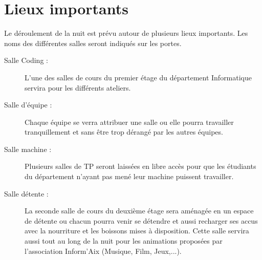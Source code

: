 \documentclass[a4paper,11pt]{article}
\begin{document}
\section{Lieux importants}
Le déroulement de la nuit est prévu autour de plusieurs lieux importants. Les noms des différentes salles seront indiqués sur les portes. 
\begin{description}
	\item[Salle Coding :] L'une des salles de cours du premier étage du département Informatique servira pour les différents ateliers.
	\item[Salle d'équipe :] Chaque équipe se verra attribuer une salle ou elle pourra travailler tranquillement et sans être trop dérangé par les autres équipes.
	\item[Salle machine :] Plusieurs salles de TP seront laissées en libre accès pour que les étudiants du département n'ayant pas mené leur machine puissent travailler.
	\item[Salle détente :] La seconde salle de cours du deuxième étage sera aménagée en un espace de détente ou chacun pourra venir se détendre et aussi recharger ses accus avec la nourriture et les boissons mises à disposition. Cette salle servira aussi tout au long de la nuit pour les animations proposées par l'association Inform'Aix (Musique, Film, Jeux,...).
\end{description}
\end{document}
